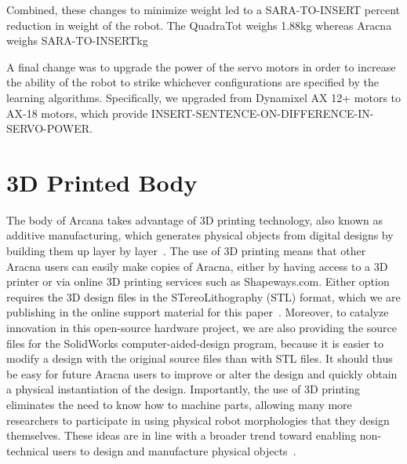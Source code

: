 \documentclass[letterpaper]{article}
\begin{document}
Combined, these changes to minimize weight led to a SARA-TO-INSERT percent reduction in weight of the robot. The QuadraTot weighs 1.88kg whereas Aracna weighs SARA-TO-INSERTkg

A final change was to upgrade the power of the servo motors in order to increase the ability of the robot to strike whichever configurations are specified by the learning algorithms. Specifically, we upgraded from Dynamixel AX 12+ motors to AX-18 motors, which provide INSERT-SENTENCE-ON-DIFFERENCE-IN-SERVO-POWER.

\section{3D Printed Body}

The body of Arcana takes advantage of 3D printing technology, also known as additive manufacturing, which generates physical objects from digital designs by building them up layer by layer~\citep{gibson2009additive, lipson2010factory}. The use of 3D printing means that other Aracna users can easily make copies of Aracna, either by having access to a 3D printer or via online 3D printing services such as Shapeways.com. Either option requires the 3D design files in the STereoLithography (STL) format, which we are publishing in the online support material for this paper~\citep{WEB}. Moreover, to catalyze innovation in this open-source hardware project, we are also providing the source files for the SolidWorks computer-aided-design program, because it is easier to modify a design with the original source files than with STL files. It should thus be easy for future Aracna users to improve or alter the design and quickly obtain a physical instantiation of the design. Importantly, the use of 3D printing eliminates the need to know how to machine parts, allowing many more researchers to participate in using physical robot morphologies that they design themselves. These ideas are in line with a broader trend toward enabling non-technical users to design and manufacture physical objects~\citep{clune2011objects, clune2011endless, lipson2010factory}.
\end{document}
